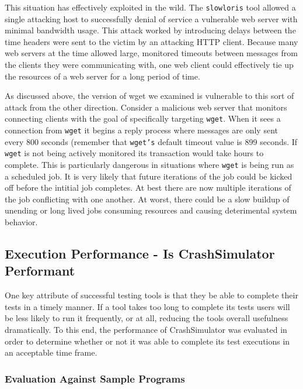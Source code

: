             This situation has effectively exploited in the wild.  The {\tt slowloris} tool allowed a single attacking
            host to successfully denial of service a vulnerable web server with minimal bandwidth usage.  This attack
            worked by introducing delays between the time headers were sent to the victim by an attacking HTTP client.
            Because many web servers at the time allowed large, monitored timeouts between messages from the clients
            they were communicating with, one web client could effectively tie up the resources of a web server for a
            long period of time.

            As discussed above, the version of wget we examined is vulnerable to this sort of attack from the other
            direction.  Consider a malicious web server that monitors connecting clients with the goal of specifically
            targeting {\tt wget}.  When it sees a connection from {\tt wget} it begins a reply process where messages
            are only sent every 800 seconds (remember that {\tt wget's} default timeout value is 899 seconds.  If {\tt
              wget} is not being actively monitored its transaction would take hours to complete.  This is particularly
            dangerous in situations where {\tt wget} is being run as a scheduled job.  It is very likely that future
            iterations of the job could be kicked off before the intitial job completes.  At best there are now multiple
            iterations of the job conflicting with one another.  At worst, there could be a slow buildup of unending or
            long lived jobs consuming resources and causing deterimental system behavior.

    \subsection{Execution Performance - Is CrashSimulator Performant}

        One key attribute of successful testing tools is that they be able to complete their tests in a timely manner.
        If a tool takes too long to complete its tests users will be less likely to run it frequently, or at all,
        reducing the tools overall usefulness dramatically. To this end, the performance of CrashSimulator was evaluated
        in order to determine whether or not it was able to complete its test executions in an acceptable time frame.

        \subsubsection{Evaluation Against Sample Programs}

